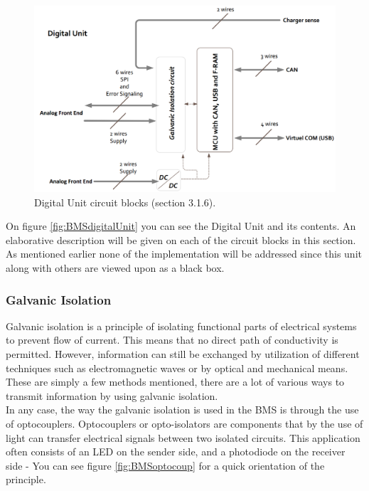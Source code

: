 \begin{figure}[H]
	\centering
	\includegraphics[width=1.0\linewidth]{Hardware/Pictures/BMSdigitalUnit}
	\caption[Empty]{Digital Unit circuit blocks \cite{BMSDocumentation} (section 3.1.6).}
	\label{fig:BMSdigitalUnit}
\end{figure}

On figure \vref{fig:BMSdigitalUnit} you can see the Digital Unit and its contents. An elaborative description will be given on each of the circuit blocks in this section. As mentioned earlier none of the implementation will be addressed since this unit along with others are viewed upon as a black box.

\subsubsection{Galvanic Isolation}
Galvanic isolation is a principle of isolating functional parts of electrical systems to prevent flow of current. This means that no direct path of conductivity is permitted. However, information can still be exchanged by utilization of different techniques such as electromagnetic waves or by optical and mechanical means. These are simply a few methods mentioned, there are a lot of various ways to transmit information by using galvanic isolation.\\
In any case, the way the galvanic isolation is used in the BMS is through the use of optocouplers. Optocouplers or opto-isolators are components that by the use of light can transfer electrical signals between two isolated circuits. This application often consists of an LED on the sender side, and a photodiode on the receiver side - You can see figure \vref{fig:BMSoptocoup} for a quick orientation of the principle.

